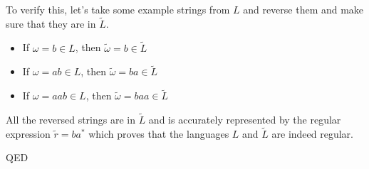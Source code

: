 \documentclass[11pt, letterpaper]{article}
\begin{document}
\noindent To verify this, let's take some example strings from $L$ and reverse them and make sure that they are in $\tilde{L}$.
\begin{itemize}
	\item If $\omega = b \in L$, then $\tilde{\omega} = b \in \tilde{L}$
	\item If $\omega = ab \in L$, then $\tilde{\omega} = ba \in \tilde{L}$
	\item If $\omega = aab \in L$, then $\tilde{\omega} = baa \in \tilde{L}$
\end{itemize}

\noindent All the reversed strings are in $\tilde{L}$ and is accurately represented by the regular expression $\tilde{r} = ba^*$ which proves that the languages $L$ and $\tilde{L}$ are indeed regular.

\noindent QED
\end{document}
